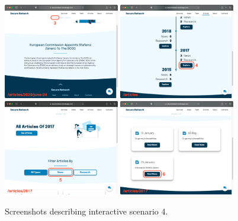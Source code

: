 \documentclass[12pt]{report}
\begin{document}
\begin{figure}[H]
	\centering
	\includegraphics[width=0.45\textwidth]{scenarios/4/3.png}
	\includegraphics[width=0.45\textwidth]{scenarios/4/4.png}
	\includegraphics[width=0.45\textwidth]{scenarios/4/5.png}
	\includegraphics[width=0.45\textwidth]{scenarios/4/6.png}
	\caption{Screenshots describing interactive scenario 4.}
\end{figure}
\end{document}
